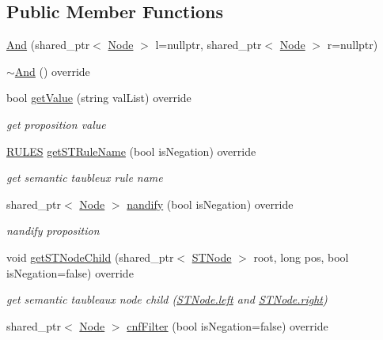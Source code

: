 \subsection*{Public Member Functions}
\begin{DoxyCompactItemize}
\item 
\hyperlink{class_and_a6058f4ed6168568b529e1e0750df8cf8}{And} (shared\+\_\+ptr$<$ \hyperlink{class_node}{Node} $>$ l=nullptr, shared\+\_\+ptr$<$ \hyperlink{class_node}{Node} $>$ r=nullptr)
\item 
\hyperlink{class_and_af7bc87f11ac21a32c28c194f3eb94650}{$\sim$\+And} () override
\item 
bool \hyperlink{class_and_a9d2b965d8a1b80d0e2da9d6537601e14}{get\+Value} (string val\+List) override
\begin{DoxyCompactList}\small\item\em get proposition value \end{DoxyCompactList}\item 
\hyperlink{proposition_2tableaux_2enum_8h_a70c93904c6a27d228050f922eb4fc3b8}{R\+U\+L\+ES} \hyperlink{class_and_a9b62ef9a38c6fe9ac96c958d46e30f7b}{get\+S\+T\+Rule\+Name} (bool is\+Negation) override
\begin{DoxyCompactList}\small\item\em get semantic taubleux rule name \end{DoxyCompactList}\item 
shared\+\_\+ptr$<$ \hyperlink{class_node}{Node} $>$ \hyperlink{class_and_a790a8f5b095f664f0a879d2bf96c972d}{nandify} (bool is\+Negation) override
\begin{DoxyCompactList}\small\item\em nandify proposition \end{DoxyCompactList}\item 
void \hyperlink{class_and_a081ebf199fb2388773a19d2c2044e574}{get\+S\+T\+Node\+Child} (shared\+\_\+ptr$<$ \hyperlink{class_s_t_node}{S\+T\+Node} $>$ root, long pos, bool is\+Negation=false) override
\begin{DoxyCompactList}\small\item\em get semantic taubleaux node child (\hyperlink{class_s_t_node_a19ba8bab4660bdeee0e897687b451a8b}{S\+T\+Node.\+left} and \hyperlink{class_s_t_node_a66d06118063fb739058f91c75b725e27}{S\+T\+Node.\+right}) \end{DoxyCompactList}\item 
shared\+\_\+ptr$<$ \hyperlink{class_node}{Node} $>$ \hyperlink{class_and_a18ea23cd682dce93808c34ea0243897f}{cnf\+Filter} (bool is\+Negation=false) override

\end{DoxyCompactItemize}
